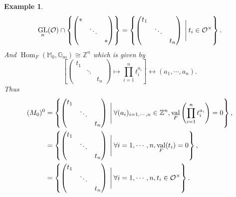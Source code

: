 \documentclass[8pt]{article}
\newtheorem{example}{Example}[section]
\DeclareMathOperator{\GL}{GL}
\DeclareMathOperator{\Hom}{Hom}
\DeclareMathOperator{\val}{val}
\newcommand{\Z}[0]{\mathbb{Z}}
\newcommand{\G}[0]{\mathbb{G}}
\newcommand{\M}[0]{\mathbb{M}}
\begin{document}
\begin{example}
  \begin{equation*}
    \GL_n(\mathcal{O})\cap\left\{\begin{pmatrix}
    \ast & \: & \: \\
    \: & \ddots & \:\\
    \: & \: & \ast
    \end{pmatrix}\right\} = \left\{\begin{pmatrix}
    t_1  & \: & \:\\
    \: & \ddots & \:\\
    \: & \: &  t_n
  \end{pmatrix}\:\Bigg{|}\: t_i\in\mathcal{O}^\times\right\}.
  \end{equation*}
  And $\Hom_F(\M_0,\G_m)\cong \Z^n$ which is given by 
  \begin{equation*}
    \left[\begin{pmatrix}
    t_1  & \: & \:\\
    \: & \ddots & \:\\
    \: & \: &  t_n
  \end{pmatrix}\mapsto \prod_{i=1}^nt_i^{a_i}\right]\leftrightarrow (a_1,\cdots,a_n).
  \end{equation*}
  Thus 
  \begin{align*}
    (M_0)^0 &= \left\{\begin{pmatrix}
    t_1  & \: & \:\\
    \: & \ddots & \:\\
    \: & \: &  t_n
  \end{pmatrix}\:\Bigg{|}\:\forall (a_i)_{i=1,\cdots,n}\in\Z^n,\val_F\left(\prod_{i=1}^n t_i^{a_i}\right)=0\right\},\\
  & = \left\{\begin{pmatrix}
    t_1  & \: & \:\\
    \: & \ddots & \:\\
    \: & \: &  t_n
  \end{pmatrix}\:\Bigg{|}\:\forall i=1,\cdots,n, \val_F(t_i)=0\right\},\\
  & = \left\{\begin{pmatrix}
    t_1  & \: & \:\\
    \: & \ddots & \:\\
    \: & \: &  t_n
  \end{pmatrix}\:\Bigg{|}\:\forall i=1,\cdots,n, t_i\in\mathcal{O}^\times\right\}.\\
  \end{align*}
\end{example}
\end{document}
